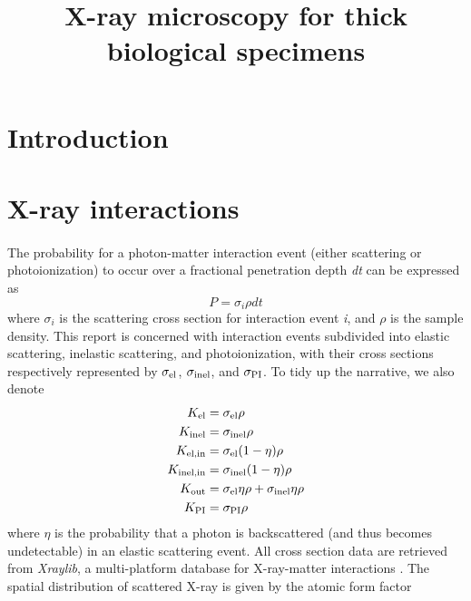 \documentclass[]{article}
\title{X-ray microscopy for thick biological specimens}
\newcommand\el{\textup{\scriptsize{el}}}
\newcommand\inel{\textup{\scriptsize{inel}}}
\newcommand\elin{\textup{\scriptsize{el,in}}}
\newcommand\inelin{\textup{\scriptsize{inel,in}}}
\newcommand\out{\textup{\scriptsize{out}}}
\newcommand\PI{\textup{\scriptsize{PI}}}
\begin{document}
\maketitle

\begin{abstract}

\end{abstract}

\section{Introduction}

\section{X-ray interactions}

\paragraph{} The probability for a photon-matter interaction event (either scattering or photoionization) to occur over a fractional penetration depth \textit{dt} can be expressed as
\begin{equation}
P = \sigma_{i} \rho dt
\end{equation}
where $\sigma_{i}$ is the scattering cross section for interaction event \textit{i}, and $\rho$ is the sample density. This report is concerned with interaction events subdivided into elastic scattering, inelastic scattering, and photoionization, with their cross sections respectively represented by $\sigma_{\el}$, $\sigma_{\inel}$, and $\sigma_{\PI}$. To tidy up the narrative, we also denote
\begin{align}
K_{\el} &= \sigma_{\el}\rho \\
K_{\inel} &= \sigma_{\inel}\rho \\
K_{\elin} &= \sigma_{\el}(1-\eta)\rho \\
K_{\inelin} &= \sigma_{\inel}(1-\eta)\rho
\label{eq:inelin} \\
K_{\out} &= \sigma_{\el}\eta\rho + \sigma_{\inel}\eta\rho \\
K_{\PI} &= \sigma_{\PI}\rho
\end{align}
where $\eta$ is the probability that a photon is backscattered (and thus becomes undetectable) in an elastic scattering event. All cross section data are retrieved from \textit{Xraylib}, a multi-platform database for X-ray-matter interactions \cite{Schoonjans:2011km}. The spatial distribution of scattered X-ray is given by the atomic form factor
\end{document}
